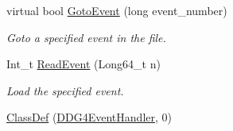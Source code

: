 \begin{DoxyCompactItemize}
virtual bool \hyperlink{class_d_d4hep_1_1_d_d_g4_event_handler_a3af4cf3191fabf450e81812e93d2502a}{GotoEvent} (long event\_\-number)
\begin{DoxyCompactList}\small\item\em Goto a specified event in the file. \item\end{DoxyCompactList}\item 
Int\_\-t \hyperlink{class_d_d4hep_1_1_d_d_g4_event_handler_ad89bd74bf6a00c80055a0332a66ddee5}{ReadEvent} (Long64\_\-t n)
\begin{DoxyCompactList}\small\item\em Load the specified event. \item\end{DoxyCompactList}\item 
\hyperlink{class_d_d4hep_1_1_d_d_g4_event_handler_a0b89e00baf1f1e9a95f4f31517635e34}{ClassDef} (\hyperlink{class_d_d4hep_1_1_d_d_g4_event_handler}{DDG4EventHandler}, 0)
\end{DoxyCompactItemize}
